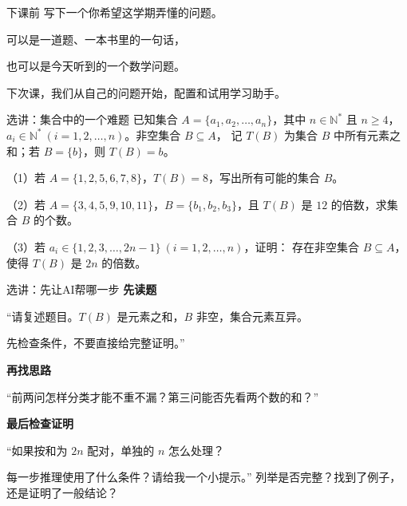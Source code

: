 \documentclass[aspectratio=169,10pt]{beamer}
\newcommand{\key}[1]{{\color{campusgreen}\bfseries #1}}
\newcommand{\smallbody}{\fontsize{11}{15}\selectfont}
\newcommand{\backtosummary}{\hfill\hyperlink{summary}{\beamerbutton{回到课堂小结}}}
\begin{document}
\begin{frame}[t,label=summary]{下课前}
  \vspace{4mm}
  写下一个你希望这学期弄懂的问题。
  \par\vspace{9mm}
  可以是一道题、一本书里的一句话，\par
  也可以是今天听到的一个数学问题。
  \par\vspace{9mm}
  下次课，我们从自己的问题开始，配置和试用学习助手。
  \vfill
  \hyperlink{setproblem}{}\hfill
  \hyperlink{finish}{}
\end{frame}
\appendix
\begin{frame}[t,label=setproblem]{选讲：集合中的一个难题}
  \smallbody
  已知集合 $A=\{a_1,a_2,\ldots,a_n\}$，其中 $n\in\mathbb N^*$ 且 $n\ge4$，
  $a_i\in\mathbb N^*\ (i=1,2,\ldots,n)$。非空集合 $B\subseteq A$，
  记 $T(B)$ 为集合 $B$ 中所有元素之和；若 $B=\{b\}$，则 $T(B)=b$。
  \par\vspace{3mm}
  （1）若 $A=\{1,2,5,6,7,8\}$，$T(B)=8$，写出所有可能的集合 $B$。
  \par\vspace{3mm}
  （2）若 $A=\{3,4,5,9,10,11\}$，$B=\{b_1,b_2,b_3\}$，且 $T(B)$ 是
  $12$ 的倍数，求集合 $B$ 的个数。
  \par\vspace{3mm}
  （3）若 $a_i\in\{1,2,3,\ldots,2n-1\}\ (i=1,2,\ldots,n)$，证明：
  存在非空集合 $B\subseteq A$，使得 $T(B)$ 是 $2n$ 的倍数。
  \par\vfill
  \backtosummary
\end{frame}

\begin{frame}[t]{选讲：先让AI帮哪一步}
  \smallbody
  \key{先读题}
  \par “请复述题目。$T(B)$ 是元素之和，$B$ 非空，集合元素互异。\par
  先检查条件，不要直接给完整证明。”
  \par\vspace{3mm}
  \key{再找思路}
  \par “前两问怎样分类才能不重不漏？第三问能否先看两个数的和？”
  \par\vspace{3mm}
  \key{最后检查证明}
  \par “如果按和为 $2n$ 配对，单独的 $n$ 怎么处理？\par
  每一步推理使用了什么条件？请给我一个小提示。”
  \vfill
   列举是否完整？找到了例子，还是证明了一般结论？
  \par\vspace{2mm}\backtosummary
\end{frame}
\end{document}
